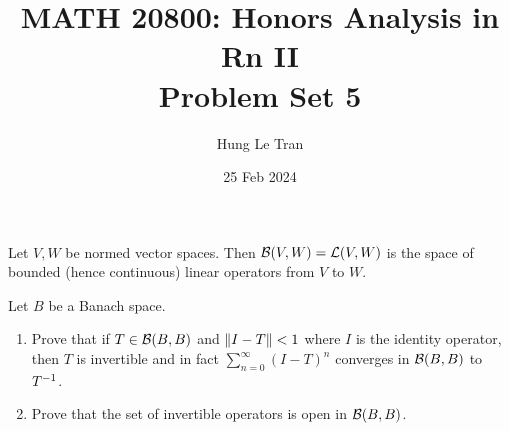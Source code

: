 \documentclass[a4paper, 10pt]{article}
\title{MATH 20800: Honors Analysis in Rn II \\ \large Problem Set 5}
\date{25 Feb 2024}
\author{Hung Le Tran}
\begin{document}
\maketitle
\setcounter{section}{5}
\begin{notation}
    Let $V, W$ be normed vector spaces. Then $\mathcal{B}(V, W) = \mathcal{L}(V, W)$ is the space of bounded (hence continuous) linear operators from $V$ to $W$.
\end{notation}
\begin{problem} 
    Let $B$ be a Banach space. \begin{enumerate}
    \item Prove that if $T \in \mathcal{B}(B, B)$ and $\lVert I - T\rVert < 1$ where $I$ is the identity operator, then $T$ is invertible and in fact $\sum_{n=0}^{\infty} (I - T)^n$ converges in $\mathcal{B}(B, B)$ to ${T}^{-1}$.
    \item Prove that the set of invertible operators is open in $\mathcal{B}(B, B)$.
    \end{enumerate}
\end{problem}
\end{document}
